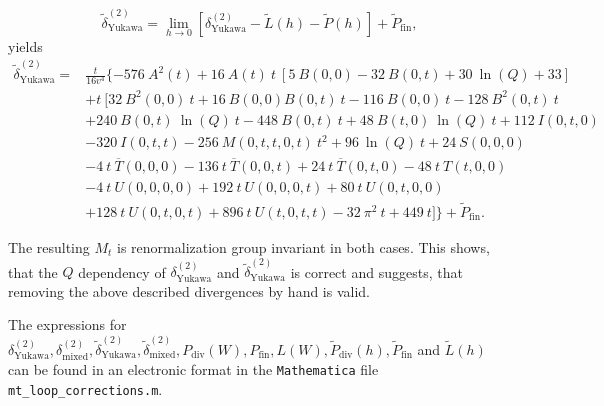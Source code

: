 \documentclass[a4paper,12pt]{book}
\begin{document}
\begin{equation}
\tilde{\delta}^{(2)}_\text{Yukawa} =\lim_{h \rightarrow 0}\left[\delta^{(2)}_\text{Yukawa}-\widetilde{L}(h)-\widetilde{P}(h)\right]+ \widetilde{P}_\text{fin},
\end{equation}
yields
\begin{align}
\nonumber
\tilde{\delta}^{(2)}_\text{Yukawa} ={}& \frac{t}{16 v^4}\{-576\> A^2(t)+16 \> A(t) \> t\> [5\> B(0,0)-32\>
B(0,t)+30\> \ln(Q)+33]\\
\nonumber
&+t\> [32\ B^2(0,0)\> t+16\> B(0,0) B(0,t)\> t-116\> B(0,0)\> t-128\> B^2(0,t)\> t\\
\nonumber
&+240\> B(0,t)\> \ln(Q)\> t-448\>B(0,t) \>t+48\> B(t,0)\> \ln(Q)\> t+112\> I(0,t,0)\\
\nonumber
&-320\>I(0,t,t)-256\> M(0,t,t,0,t)\> t^2+96\> \ln(Q)\> t+24\> S(0,0,0)\\
\nonumber
&-4\> t\>
\overline{T}(0,0,0)-136\> t\> \overline{T}(0,0,t)+24\> t\> \overline{T}(0,t,0)-48\> t\>T(t,0,0)\\
\nonumber
&-4\> t\> U(0,0,0,0)+192\> t\> U(0,0,0,t)+80\> t\> U(0,t,0,0)\\
&+128\> t\> U(0,t,0,t)+896\> t\> U(t,0,t,t)-32\> \pi^2\> t+449\> t]\}+\widetilde{P}_\text{fin}.
\end{align}
\par 
The resulting $M_t$ is renormalization group invariant in both cases. This shows, that the $Q$ dependency of $\delta^{(2)}_\text{Yukawa}$ and $\tilde{\delta}^{(2)}_\text{Yukawa}$ is correct and suggests, that removing the above described divergences by hand is valid.\par
The expressions for $\delta^{(2)}_\text{Yukawa}, \delta^{(2)}_\text{mixed},\tilde{\delta}^{(2)}_\text{Yukawa},\tilde{\delta}^{(2)}_\text{mixed},P_\text{div}(W),P_\text{fin}, L(W), \widetilde{P}_\text{div}(h),\widetilde{P}_\text{fin}$ and $\widetilde{L}(h)$ can be found in an electronic format in the \texttt{Mathematica} file \texttt{mt\_loop\_corrections.m}.
\end{document}
